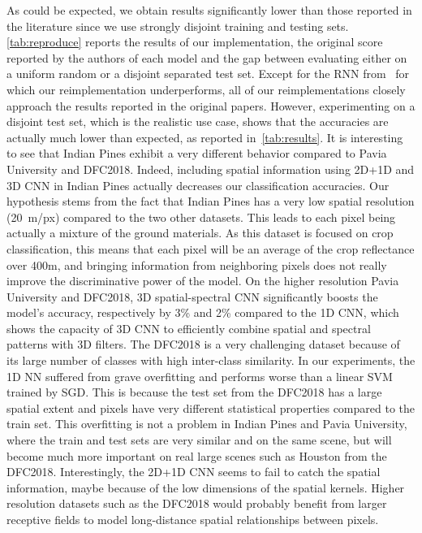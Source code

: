 \documentclass[journal]{IEEEtran}
\begin{document}
As could be expected, we obtain results significantly lower than those reported in the literature since we use strongly disjoint training and testing sets. \cref{tab:reproduce} reports the results of our implementation, the original score reported by the authors of each model and the gap between evaluating either on a uniform random or a disjoint separated test set. Except for the RNN from~\cite{mou_deep_2017} for which our reimplementation underperforms, all of our reimplementations closely approach the results reported in the original papers. However, experimenting on a disjoint test set, which is the realistic use case, shows that the  accuracies are actually much lower than expected, as reported in~\cref{tab:results}. It is interesting to see that Indian Pines exhibit a very different behavior compared to Pavia University and DFC2018. Indeed, including spatial information using 2D+1D and 3D CNN in Indian Pines actually decreases our classification accuracies. Our hypothesis stems from the fact that Indian Pines has a very low spatial resolution (20~m/px) compared to the two other datasets. This leads to each pixel being actually a mixture of the ground materials. As this dataset is focused on crop classification, this means that each pixel will be an average of the crop reflectance over 400m, and bringing information from neighboring pixels does not really improve the discriminative power of the model. On the higher resolution Pavia University and DFC2018, 3D spatial-spectral CNN significantly boosts the model's accuracy, respectively by 3\% and 2\% compared to the 1D CNN, which shows the capacity of 3D CNN to efficiently combine spatial and spectral patterns with 3D filters. The DFC2018 is a very challenging dataset because of its large number of classes with high inter-class similarity. In our experiments, the 1D NN suffered from grave overfitting and performs worse than a linear SVM trained by SGD. This is because the test set from the DFC2018 has a large spatial extent and pixels have very different statistical properties compared to the train set. This overfitting is not a problem in Indian Pines and Pavia University, where the train and test sets are very similar and on the same scene, but will become much more important on real large scenes such as Houston from the DFC2018. Interestingly, the 2D+1D CNN seems to fail to catch the spatial information, maybe because of the low dimensions of the spatial kernels. Higher resolution datasets such as the DFC2018 would probably benefit from larger receptive fields to model long-distance spatial relationships between pixels.
\end{document}
